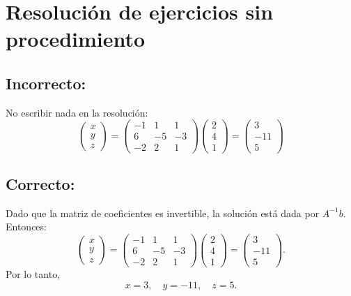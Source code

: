 \documentclass[a4,11pt]{aleph-notas}
\begin{document}
\encabezado

\section{Resolución de ejercicios sin procedimiento}

\subsection*{Incorrecto:}
No escribir nada en la resolución:
\[
    \begin{pmatrix}
    x \\ y \\ z
    \end{pmatrix}
    =
    \begin{pmatrix}
    -1 & 1 & 1\\
    6 & -5 & -3\\
    -2 & 2 & 1
    \end{pmatrix}
    \begin{pmatrix}
    2 \\ 4 \\ 1
    \end{pmatrix}
    =
    \begin{pmatrix}
    3 \\ -11 \\ 5
    \end{pmatrix}
\]

\subsection*{Correcto:}
Dado que la matriz de coeficientes es invertible, la solución está dada por $A^{-1}b$. Entonces:
\[
    \begin{pmatrix}
    x \\ y \\ z
    \end{pmatrix}
    =
    \begin{pmatrix}
    -1 & 1 & 1\\
    6 & -5 & -3\\
    -2 & 2 & 1
    \end{pmatrix}
    \begin{pmatrix}
    2 \\ 4 \\ 1
    \end{pmatrix}
    =
    \begin{pmatrix}
    3 \\ -11 \\ 5
    \end{pmatrix}.
\]
Por lo tanto,
\[
    x = 3,\quad y = -11,\quad z = 5.
\]
\end{document}
